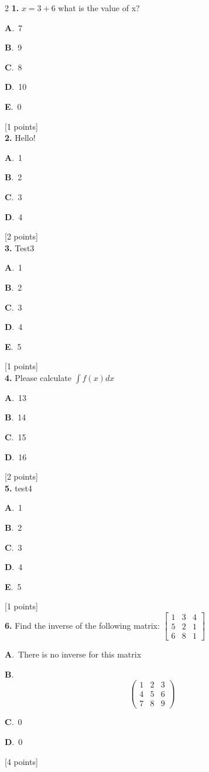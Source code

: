 \documentclass[12pt]{article}
\newcommand{\choice}[3]{%
  \noindent\textbf{#1}.~#2\hfill#3\par\vspace{0.25em}
}
\begin{document}
\begin{multicols}{2}
\noindent \textbf{\textenglish{1.}} \(x=3+6 \){\textenglish{ what is the value of x?}}

\noindent\choice{A}{{\textenglish{7}}}{}
\noindent\choice{B}{{\textenglish{9}}}{}
\noindent\choice{C}{{\textenglish{8}}}{}
\noindent\choice{D}{{\textenglish{10}}}{}
\noindent\choice{E}{{\textenglish{0}}}{}
\hfill {\textenglish{[1 points]}}\\[0.5em]

\noindent \textbf{\textenglish{2.}} {\textenglish{Hello!}}

\noindent\choice{A}{{\textenglish{1}}}{}
\noindent\choice{B}{{\textenglish{2}}}{}
\noindent\choice{C}{{\textenglish{3}}}{}
\noindent\choice{D}{{\textenglish{4}}}{}
\hfill {\textenglish{[2 points]}}\\[0.5em]

\noindent \textbf{\textenglish{3.}} {\textenglish{Test3}}

\noindent\choice{A}{{\textenglish{1}}}{}
\noindent\choice{B}{{\textenglish{2}}}{}
\noindent\choice{C}{{\textenglish{3}}}{}
\noindent\choice{D}{{\textenglish{4}}}{}
\noindent\choice{E}{{\textenglish{5}}}{}
\hfill {\textenglish{[1 points]}}\\[0.5em]

\noindent \textbf{\textenglish{4.}} {\textenglish{Please calculate }}\(\int f(x)dx\)

\noindent\choice{A}{{\textenglish{13}}}{}
\noindent\choice{B}{{\textenglish{14}}}{}
\noindent\choice{C}{{\textenglish{15}}}{}
\noindent\choice{D}{{\textenglish{16}}}{}
\hfill {\textenglish{[2 points]}}\\[0.5em]

\noindent \textbf{\textenglish{5.}} {\textenglish{test4}}

\noindent\choice{A}{{\textenglish{1}}}{}
\noindent\choice{B}{{\textenglish{2}}}{}
\noindent\choice{C}{{\textenglish{3}}}{}
\noindent\choice{D}{{\textenglish{4}}}{}
\noindent\choice{E}{{\textenglish{5}}}{}
\hfill {\textenglish{[1 points]}}\\[0.5em]

\noindent \textbf{\textenglish{6.}} {\textenglish{Find the inverse of the following matrix: }}\(\begin{bmatrix} 1 & 3 & 4 \\ 5 & 2 & 1 \\ 6 & 8 & 1 \end{bmatrix}\)

\noindent\choice{A}{{\textenglish{There is no inverse for this matrix}}}{}
\noindent\choice{B}{\[\begin{pmatrix} 1 & 2 & 3 \\ 4 & 5 & 6 \\ 7 & 8 & 9  \end{pmatrix}\]}{}
\noindent\choice{C}{{\textenglish{0}}}{}
\noindent\choice{D}{{\textenglish{0}}}{}
\hfill {\textenglish{[4 points]}}\\[0.5em]


\end{multicols}
\end{document}
